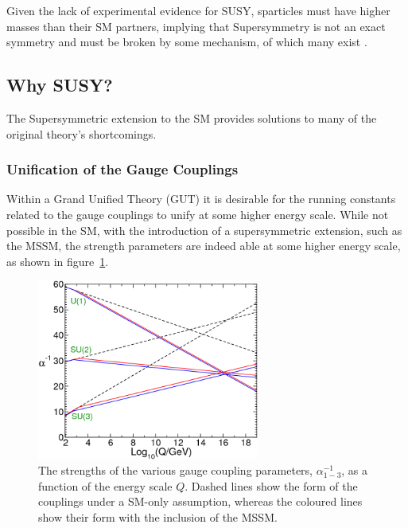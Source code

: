 Given the lack of experimental evidence for SUSY, sparticles must
have higher masses than their SM partners, implying that Supersymmetry is not
an exact symmetry and must be broken by some mechanism, of which many
exist \cite{ref:hierarchy1,ref:hierarchy2}.

\subsection{Why SUSY?}
The Supersymmetric extension to the SM provides solutions to many of the
original theory's shortcomings.

\subsubsection{Unification of the Gauge Couplings}
Within a Grand Unified Theory (GUT) it is desirable
for the running constants related to the gauge couplings to unify at some
higher energy scale. While not possible in the SM, with the introduction of a
supersymmetric extension, such as the MSSM, the strength parameters are indeed able at
some higher energy scale, as shown in figure~\ref{fig:uni_gauge}.

\begin{figure}[h!]
  \centering
  \includegraphics[width=0.65\textwidth]{Figs/susy/unification_primer.png}
  \caption{The strengths of the various gauge coupling parameters,
  $\alpha^{-1}_{1-3}$, as a function of the energy scale $Q$. Dashed lines
  show the form of the couplings under a SM-only assumption, whereas the coloured
  lines show their form with the inclusion of the MSSM. \cite{Martin:1997ns}}
  \label{fig:uni_gauge}
\end{figure}

